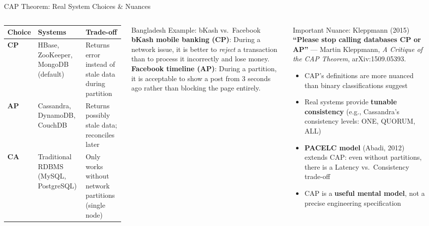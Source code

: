 \documentclass[aspectratio=169,10pt]{beamer}
\begin{document}
\begin{frame}{CAP Theorem: Real System Choices \& Nuances}
  \begin{columns}[T]
      \centering
      \renewcommand{\arraystretch}{1.45}
      \begin{tabular}{p{1.5cm}p{2.8cm}p{2.6cm}}
        \toprule
        \textbf{Choice} & \textbf{Systems} & \textbf{Trade-off} \\
        \midrule
        \textbf{CP} & HBase, ZooKeeper, MongoDB (default) & Returns error instead of stale data during partition \\[4pt]
        \textbf{AP} & Cassandra, DynamoDB, CouchDB & Returns possibly stale data; reconciles later \\[4pt]
        \textbf{CA} & Traditional RDBMS (MySQL, PostgreSQL) & Only works without network partitions (single node) \\
        \bottomrule
      \end{tabular}
      \vspace{8pt}
      \begin{exampleblock}{Bangladesh Example: bKash vs.\ Facebook}
        \small
        \textbf{bKash mobile banking (CP)}: During a network issue, it is better to \emph{reject} a transaction than to process it incorrectly and lose money.\\[4pt]
        \textbf{Facebook timeline (AP)}: During a partition, it is acceptable to show a post from 3 seconds ago rather than blocking the page entirely.
      \end{exampleblock}

      \begin{alertblock}{Important Nuance: Kleppmann (2015)}
        \textbf{``Please stop calling databases CP or AP''} --- Martin Kleppmann, \textit{A Critique of the CAP Theorem}, arXiv:1509.05393.
        \vspace{6pt}
        \begin{itemize}
          \small
          \item CAP's definitions are more nuanced than binary classifications suggest
          \item Real systems provide \textbf{tunable consistency} (e.g., Cassandra's consistency levels: ONE, QUORUM, ALL)
          \item \textbf{PACELC model} (Abadi, 2012) extends CAP: even without partitions, there is a Latency vs.\ Consistency trade-off
          \item CAP is a \textbf{useful mental model}, not a precise engineering specification
        \end{itemize}
      \end{alertblock}
  \end{columns}
\end{frame}
\end{document}
